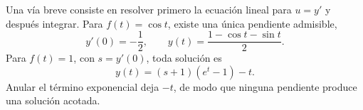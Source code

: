 Una vía breve consiste en resolver primero la ecuación lineal para \(u=y'\) y después integrar. Para \(f(t)=\cos t\), existe una única pendiente admisible,
\[
y'(0)=-\frac12,\qquad
 y(t)=\frac{1-\cos t-\sin t}{2}.
\]
Para \(f(t)=1\), con \(s=y'(0)\), toda solución es
\[
y(t)=(s+1)(e^t-1)-t.
\]
Anular el término exponencial deja \(-t\), de modo que ninguna pendiente produce una solución acotada.
